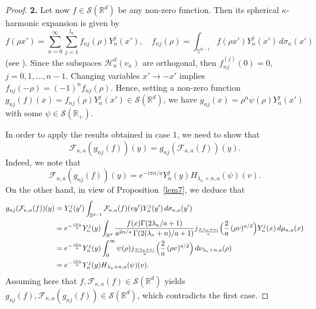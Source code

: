 \documentclass[12pt,twoside,reqno]{amsart}\usepackage[cp1251]{inputenc}
\theoremstyle{plain}
\theoremstyle{remark}
\begin{document}
\begin{proof}
\smallbreak
\textbf{2.}
Let now $f\in\mathcal{S}(\mathbb{R}^d)$ be any non-zero function. Then
its spherical $\kappa$-harmonic expansion is given by
\[
f(\rho x')=\sum_{n=0}^{\infty}\sum_{j=1}^{l_{n}}f_{nj}(\rho)Y_{n}^{j}(x'),\quad f_{nj}(\rho)=\int_{\mathbb{S}^{d-1}}f(\rho x')Y_{n}^{j}(x')\,d\sigma_{\kappa}(x')
\]
(see \cite{GIT16}). Since the subspaces  $\mathcal{H}_n^d(v_{\kappa})$ are orthogonal, then $f_{nj}^{(j)}(0)=0$, $j=0,1,\dots,n-1$.
Changing variables  $x'\to -x'$ implies
$f_{nj}(-\rho)%
=(-1)^nf_{nj}(\rho).
$
Hence,
setting a non-zero function $g_{nj}(f)(x)=f_{nj}(\rho)Y_{n}^{j}(x')\in\mathcal{S}(\mathbb{R}^d)$,
we have $g_{nj}(x)=\rho^n\psi(\rho)Y_{n}^{j}(x')$ with some $\psi\in\mathcal{S}(\mathbb{R}_+)$. %

 In order to apply the  results obtained in case 1, we need to show that
$$\mathcal{F}_{\kappa,a}(g_{nj}(f))(y)=g_{nj}(\mathcal{F}_{\kappa,a}(f))(y).$$ Indeed, we note that %
\[
\mathcal{F}_{\kappa,a}(g_{nj}(f))(y)=e^{-i\pi n/a}Y_n^j(y)H_{\lambda_{\kappa}+n,a}(\psi)(v).
\]
On the other hand, in view of  Proposition~\ref{lem7}, we deduce that %
\begin{align*}
g_{nj}(\mathcal{F}_{\kappa,a}(f))(y)&=Y_{n}^{j}(y')\int_{\mathbb{S}^{d-1}}\mathcal{F}_{\kappa,a}(f)(vy')Y_{n}^{j}(y')\,d\sigma_{\kappa,a}(y')\\
&=e^{-\frac{i\pi n}{a}}Y_{n}^{j}(y) \int_{\mathbb{R}^d}\frac{f(x)\Gamma(2\lambda_{\kappa}/a+1)}{a^{2n/a}
\,\Gamma(2(\lambda_{\kappa}+n)/a+1)}
j_{\frac{2(\lambda_{\kappa}+n)}{a}}\Bigl(\frac{2}{a}\,(\rho v)^{a/2}\Bigr)Y_n^j(x)\,d\mu_{\kappa,a}(x) \\
&=e^{-\frac{i\pi n}{a}}Y_{n}^{j}(y)\int_{0}^{\infty}\psi(\rho)
j_{\frac{2(\lambda_{\kappa}+n)}{a}}\Bigl(\frac{2}{a}\,(\rho v)^{a/2}\Bigr)\,d\nu_{\lambda_{\kappa}+n,a}(\rho)\\
&=e^{-\frac{i\pi n}{a}}Y_n^j(y)H_{\lambda_{\kappa}+n,a}(\psi)(v).
\end{align*}
Assuming here that  $f,\mathcal{F}_{\kappa,a}(f)\in\mathcal{S}(\mathbb{R}^d)$ yields  $g_{nj}(f),\mathcal{F}_{\kappa,a}(g_{nj}(f))\in\mathcal{S}(\mathbb{R}^d)$, which contradicts the first case.
\end{proof}
\end{document}
